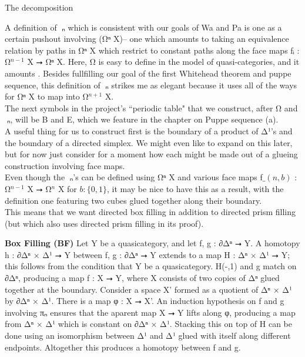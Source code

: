 \documentclass{book}
\theoremstyle{definition}
\begin{document}
The decomposition 

A definition of π⃗ₙ which is consistent with our goals of Wa and Pa is one as a certain pushout involving (Ω⃗ⁿ X)-- one which amounts to taking an equivalence relation by paths in Ω⃗ⁿ X which restrict to constant paths along the face maps fᵢ : Ω⃗${}^{n-1}$ X ⭢ Ω⃗ⁿ X. Here, Ω⃗ is easy to define in the model of quasi-categories, and it amounts . Besides fullfilling our goal of the first Whitehead theorem and puppe sequence, this definition of π⃗ₙ strikes me as elegant because it uses all of the ways for Ω⃗ⁿ X to map into Ω⃗${}^{n+1}$ X.\\

The next symbols in the project's ``periodic table" that we construct, after Ω⃗ and π⃗ₙ, will be B⃗ and E⃗, which we feature in the chapter on Puppe sequence (a).\\

A useful thing for us to construct first is the boundary of a product of Δ¹'s and the boundary of a directed simplex. We might even like to expand on this later, but for now just consider for a moment how each might be made out of a glueing construction involving face maps.\\

Even though the π⃗ₙ's can be defined using Ω⃗ⁿ X and various face maps f$\_(n,b)$ : Ω⃗${}^{n-1}$ X ⭢ Ω⃗${}^{n}$ X for $b : \{ 0, 1 \}$, it may be nice to have this as a result, with the definition one featuring two cubes glued together along their boundary.\\

This means that we want directed box filling in addition to directed prism filling (but which also uses directed prism filling in its proof).

{\bf Box Filling (BF)} Let Y be a quasicategory, and let f, g : ∂Δⁿ ⭢ Y. A homotopy h : ∂Δⁿ × Δ¹ ⭢ Y between f, g : ∂Δⁿ ⭢ Y extends to a map H : Δⁿ × Δ¹ ⭢ Y; this follows from the condition that Y be a quasicategory. H(-,1) and g match on ∂Δⁿ, producing a map f : X ⭢ Y, where X consists of two copies of Δⁿ glued together at the boundary. Consider a space X' formed as a quotient of Δⁿ × Δ¹ by ∂Δⁿ × Δ¹. There is a map φ : X ⭢ X'. An induction hypothesis on f and g involving πₙ ensures that the aparent map X ⭢ Y lifts along φ, producing a map from Δⁿ × Δ¹ which is constant on ∂Δⁿ × Δ¹. Stacking this on top of H can be done using an isomorphism between Δ¹ and Δ¹ glued with itself along different endpoints. Altogether this produces a homotopy between f and g.\\
\end{document}

